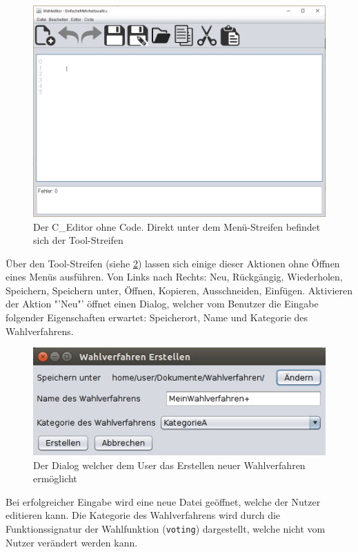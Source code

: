 \documentclass[a4paper]{scrreprt}
\begin{document}
\begin{figure}[H]
\includegraphics[scale=0.5]{Editor-ohne-text.png}
\caption{Der C_Editor ohne Code. Direkt unter dem Menü-Streifen befindet sich der Tool-Streifen}
\label{C-Editor-Tool-Streifen}
\end{figure}

Über den Tool-Streifen (siehe \ref{C-Editor-Tool-Streifen}) lassen sich einige dieser Aktionen ohne Öffnen eines Menüs ausführen. Von Links nach Rechts: Neu, Rückgängig, Wiederholen, Speichern, Speichern unter, Öffnen, Kopieren, Ausschneiden, Einfügen. Aktivieren der Aktion "'Neu"' öffnet einen Dialog, welcher vom Benutzer die Eingabe folgender Eigenschaften erwartet: Speicherort, Name und Kategorie des Wahlverfahrens.

\begin{figure}[H]
\includegraphics[scale=0.5]{Wahlverfahren-Erstellen.png}
\caption{Der Dialog welcher dem User das Erstellen neuer Wahlverfahren ermöglicht}
\label{C-Editor-Tool-Streifen}
\end{figure}

Bei erfolgreicher Eingabe wird eine neue Datei geöffnet, welche der Nutzer editieren kann. Die Kategorie des Wahlverfahrens wird durch die Funktionssignatur der Wahlfunktion (\texttt{voting}) dargestellt, welche nicht vom Nutzer verändert werden kann. 
\end{document}
